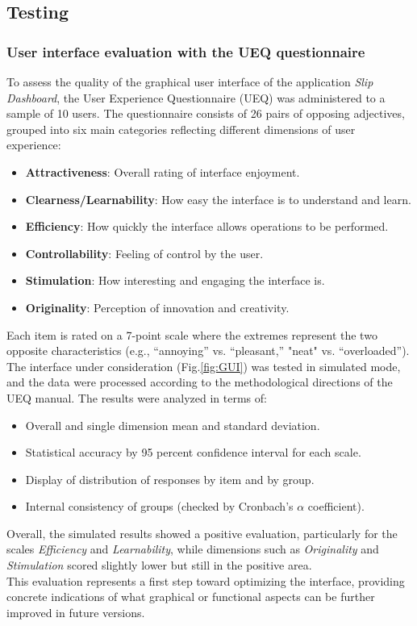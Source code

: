 \documentclass[a4paper,final,12pt]{report}
\begin{document}
\subsection{Testing}
\subsubsection{User interface evaluation with the UEQ questionnaire}

To assess the quality of the graphical user interface of the application \textit{Slip Dashboard}, the User Experience Questionnaire (UEQ) was administered to a sample of 10 users. The questionnaire consists of 26 pairs of opposing adjectives, grouped into six main categories reflecting different dimensions of user experience:
\begin{itemize}
    \item \textbf{Attractiveness}: Overall rating of interface enjoyment.
    \item \textbf{Clearness/Learnability}: How easy the interface is to understand and learn.
    \item \textbf{Efficiency}: How quickly the interface allows operations to be performed.
    \item \textbf{Controllability}: Feeling of control by the user.
    \item \textbf{Stimulation}: How interesting and engaging the interface is.
    \item \textbf{Originality}: Perception of innovation and creativity.
\end{itemize}

Each item is rated on a 7-point scale where the extremes represent the two opposite characteristics (e.g., “annoying” vs. “pleasant,” "neat" vs. “overloaded”).\\
The interface under consideration (Fig.\ref{fig:GUI}) was tested in simulated mode, and the data were processed according to the methodological directions of the UEQ manual. The results were analyzed in terms of:
\begin{itemize}
    \item Overall and single dimension mean and standard deviation.
    \item Statistical accuracy by 95 percent confidence interval for each scale.
    \item Display of distribution of responses by item and by group.
    \item Internal consistency of groups (checked by Cronbach's $\alpha$ coefficient).
\end{itemize}
Overall, the simulated results showed a positive evaluation, particularly for the scales \textit{Efficiency} and \textit{Learnability}, while dimensions such as \textit{Originality} and \textit{Stimulation} scored slightly lower but still in the positive area.\\
This evaluation represents a first step toward optimizing the interface, providing concrete indications of what graphical or functional aspects can be further improved in future versions.
\end{document}
